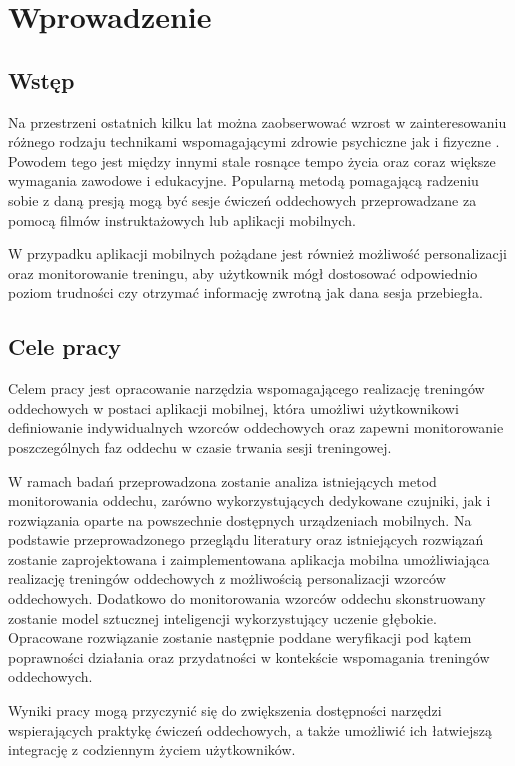 \chapter{Wprowadzenie}

\section{Wstęp}
Na przestrzeni ostatnich kilku lat można zaobserwować wzrost w zainteresowaniu różnego rodzaju technikami wspomagającymi zdrowie psychiczne jak i fizyczne \cite{ristovski2023importance}. Powodem tego jest między innymi stale rosnące tempo życia oraz coraz większe wymagania zawodowe i edukacyjne. Popularną metodą pomagającą radzeniu sobie z daną presją mogą być sesje ćwiczeń oddechowych przeprowadzane za pomocą filmów instruktażowych lub aplikacji mobilnych. 

W przypadku aplikacji mobilnych pożądane jest również możliwość personalizacji oraz monitorowanie treningu, aby użytkownik mógł dostosować odpowiednio poziom trudności czy otrzymać informację zwrotną jak dana sesja przebiegła.

\section{Cele pracy}
Celem pracy jest opracowanie narzędzia wspomagającego realizację treningów oddechowych w postaci aplikacji mobilnej, która umożliwi użytkownikowi definiowanie indywidualnych wzorców oddechowych oraz zapewni monitorowanie poszczególnych faz oddechu w czasie trwania sesji treningowej. 

W ramach badań przeprowadzona zostanie analiza istniejących metod monitorowania oddechu, zarówno wykorzystujących dedykowane czujniki, jak i rozwiązania oparte na powszechnie dostępnych urządzeniach mobilnych. Na podstawie przeprowadzonego przeglądu literatury oraz istniejących rozwiązań zostanie zaprojektowana i zaimplementowana aplikacja mobilna umożliwiająca realizację treningów oddechowych z możliwością personalizacji wzorców oddechowych. Dodatkowo do monitorowania wzorców oddechu skonstruowany zostanie model sztucznej inteligencji wykorzystujący uczenie głębokie. Opracowane rozwiązanie zostanie następnie poddane weryfikacji pod kątem poprawności działania oraz przydatności w kontekście wspomagania treningów oddechowych.

Wyniki pracy mogą przyczynić się do zwiększenia dostępności narzędzi wspierających praktykę ćwiczeń oddechowych, a także umożliwić ich łatwiejszą integrację z codziennym życiem użytkowników.